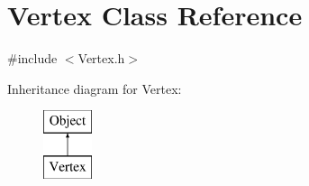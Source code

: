 \hypertarget{class_vertex}{}\section{Vertex Class Reference}
\label{class_vertex}


{\ttfamily \#include $<$Vertex.\+h$>$}

Inheritance diagram for Vertex\+:\begin{figure}[H]
\begin{center}
\leavevmode
\includegraphics[height=2.000000cm]{class_vertex}
\end{center}
\end{figure}
